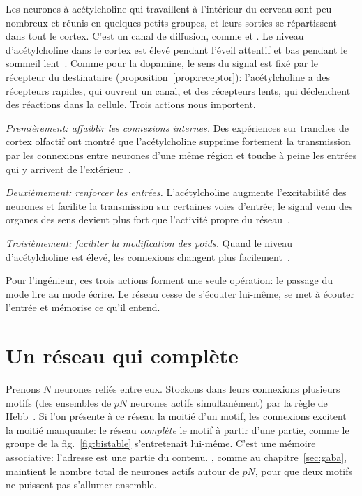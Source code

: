 Les neurones à acétylcholine qui travaillent à l'intérieur du cerveau sont peu nombreux et réunis en quelques petits groupes, et leurs sorties se répartissent dans tout le cortex. C'est un canal de diffusion, comme  et . Le niveau d'acétylcholine dans le cortex est élevé pendant l'éveil attentif et bas pendant le sommeil lent~\cite{Hasselmo1999}. Comme pour la dopamine, le sens du signal est fixé par le récepteur du destinataire (proposition~\ref{prop:receptor}): l'acétylcholine a des récepteurs rapides, qui ouvrent un canal, et des récepteurs lents, qui déclenchent des réactions dans la cellule. Trois actions nous importent.

\emph{Premièrement: affaiblir les connexions internes.} Des expériences sur tranches de cortex olfactif ont montré que l'acétylcholine supprime fortement la transmission par les connexions entre neurones d'une même région et touche à peine les entrées qui y arrivent de l'extérieur~\cite{HasselmoBower1992}.

\emph{Deuxièmement: renforcer les entrées.} L'acétylcholine augmente l'excitabilité des neurones et facilite la transmission sur certaines voies d'entrée; le signal venu des organes des sens devient plus fort que l'activité propre du réseau~\cite{Hasselmo2006}.

\emph{Troisièmement: faciliter la modification des poids.} Quand le niveau d'acétylcholine est élevé, les connexions changent plus facilement~\cite{Hasselmo2006}.

Pour l'ingénieur, ces trois actions forment une seule opération: le passage du mode \og lire\fg{} au mode \og écrire\fg{}. Le réseau cesse de s'écouter lui-même, se met à écouter l'entrée et mémorise ce qu'il entend.

\section{Un réseau qui complète}

Prenons $N$ neurones  reliés entre eux. Stockons dans leurs connexions plusieurs motifs (des ensembles de $pN$ neurones actifs simultanément) par la règle de Hebb~\cite{Hebb1949}. Si l'on présente à ce réseau la moitié d'un motif, les connexions excitent la moitié manquante: le réseau \emph{complète} le motif à partir d'une partie, comme le groupe de la fig.~\ref{fig:bistable} s'entretenait lui-même. C'est une mémoire associative: l'adresse est une partie du contenu. , comme au chapitre~\ref{sec:gaba}, maintient le nombre total de neurones actifs autour de $pN$, pour que deux motifs ne puissent pas s'allumer ensemble.

